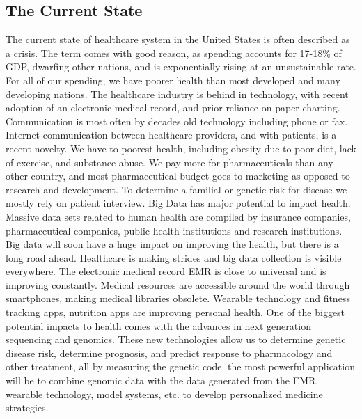 \documentclass[sigconf]{acmart}
\begin{document}
\subsection{The Current State}
    The current state of healthcare system in the United States is often
described as a crisis.  The term comes with good reason, as spending
accounts for 17-18\% of GDP, dwarfing other nations, and is
exponentially rising at an unsustainable rate.  For all of our
spending, we have poorer health than most developed and many
developing nations.  The healthcare industry is behind in technology,
with recent adoption of an electronic medical record, and prior
reliance on paper charting.  Communication is most often by decades
old technology including phone or fax.  Internet communication between
healthcare providers, and with patients, is a recent novelty.  We have
to poorest health, including obesity due to poor diet, lack of
exercise, and substance abuse.  We pay more for pharmaceuticals than
any other country, and most pharmaceutical budget goes to marketing as
opposed to research and development.  To determine a familial or genetic risk for disease we mostly rely on patient interview.  
Big Data has major potential to impact health.  Massive data sets
related to human health are compiled by insurance companies,
pharmaceutical companies, public health institutions and research
institutions.  Big data will soon have a huge impact on improving the
health, but there is a long road ahead.  \cite{fox6} Healthcare is
making strides and big data collection is visible everywhere.  The
electronic medical record EMR is close to universal and is improving
constantly.  Medical resources are accessible around the world through
smartphones, making medical libraries obsolete.  Wearable technology and fitness
tracking apps, nutrition apps are improving personal health.  One of the biggest potential impacts to health comes with the advances in next generation sequencing and genomics. These new technologies allow us to determine genetic disease risk, determine prognosis, and predict response to pharmacology and other treatment, all by measuring the genetic code.  the most powerful application will be to combine  genomic data with the data generated from the EMR, wearable technology, model systems, etc. to develop personalized medicine strategies.     
\end{document}

